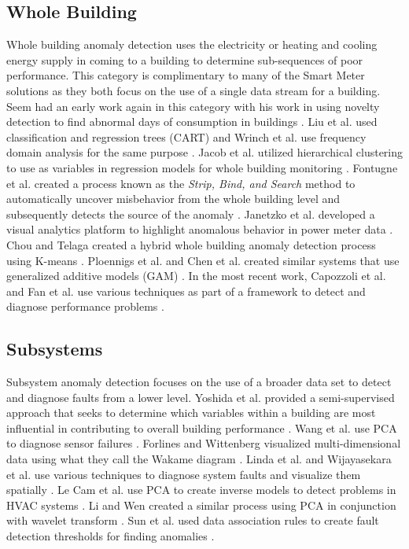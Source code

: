 \subsection{Whole Building}
Whole building anomaly detection uses the electricity or heating and cooling energy supply in coming to a building to determine sub-sequences of poor performance. This category is complimentary to many of the Smart Meter solutions as they both focus on the use of a single data stream for a building. Seem had an early work again in this category with his work in using novelty detection to find abnormal days of consumption in buildings \citep{seem_using_2006}. Liu et al. used classification and regression trees (CART) \citep{liu_method_2010} and Wrinch et al. use frequency domain analysis for the same purpose \citep{wrinch_anomaly_2012}. Jacob et al. utilized hierarchical clustering to use as variables in regression models for whole building monitoring \citep{jacob_black-box_2010}. Fontugne et al. created a process known as the \emph{Strip, Bind, and Search} method to automatically uncover misbehavior from the whole building level and subsequently detects the source of the anomaly \citep{fontugne_strip_2013}. Janetzko et al. developed a visual analytics platform to highlight anomalous behavior in power meter data \citep{janetzko_anomaly_2013}. Chou and Telaga created a hybrid whole building anomaly detection process using K-means \citep{chou_real-time_2014}. Ploennigs et al. and Chen et al. created similar systems that use generalized additive models (GAM) \citep{ploennigs_exploiting_2013,chen_statistical_2014}. In the most recent work, Capozzoli et al. and Fan et al. use various techniques as part of a framework to detect and diagnose performance problems \citep{capozzoli_fault_2015,fan_framework_2015}. 

\subsection{Subsystems}
Subsystem anomaly detection focuses on the use of a broader data set to detect and diagnose faults from a lower level. Yoshida et al. provided a semi-supervised approach that seeks to determine which variables within a building are most influential in contributing to overall building performance  \citep{yoshida_identification_2008}. Wang et al. use PCA to diagnose sensor failures \citep{wang_system-level_2010}. Forlines and Wittenberg visualized multi-dimensional data using what they call the Wakame diagram \citep{forlines_wakame:_2010}. Linda et al. and Wijayasekara et al. use various techniques to diagnose system faults and visualize them spatially \citep{linda_computational_2012,wijayasekara_mining_2014}. Le Cam et al. use PCA to create inverse models to detect problems in HVAC systems \citep{le_cam_application_2014}. Li and Wen created a similar process using PCA in conjunction with wavelet transform \citep{li_model-based_2014}. Sun et al. used data association rules to create fault detection thresholds for finding anomalies \citep{sun_efficient_2015}.

